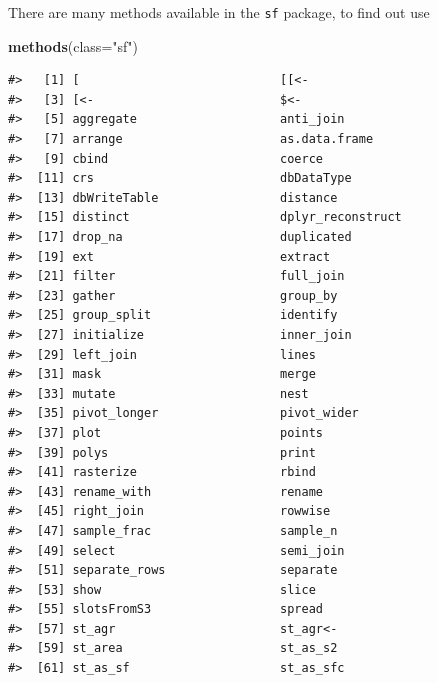 \documentclass[
]{book}
\newenvironment{Shaded}{\begin{snugshade}}{\end{snugshade}}
\newcommand{\AttributeTok}[1]{\textcolor[rgb]{0.13,0.29,0.53}{#1}}
\newcommand{\FunctionTok}[1]{\textcolor[rgb]{0.13,0.29,0.53}{\textbf{#1}}}
\newcommand{\NormalTok}[1]{#1}
\newcommand{\StringTok}[1]{\textcolor[rgb]{0.31,0.60,0.02}{#1}}
\begin{document}
There are many methods available in the \texttt{sf} package, to find out use

\begin{Shaded}
\begin{Highlighting}[]
\FunctionTok{methods}\NormalTok{(}\AttributeTok{class=}\StringTok{"sf"}\NormalTok{)}
\end{Highlighting}
\end{Shaded}

\begin{verbatim}
#>   [1] [                            [[<-                        
#>   [3] [<-                          $<-                         
#>   [5] aggregate                    anti_join                   
#>   [7] arrange                      as.data.frame               
#>   [9] cbind                        coerce                      
#>  [11] crs                          dbDataType                  
#>  [13] dbWriteTable                 distance                    
#>  [15] distinct                     dplyr_reconstruct           
#>  [17] drop_na                      duplicated                  
#>  [19] ext                          extract                     
#>  [21] filter                       full_join                   
#>  [23] gather                       group_by                    
#>  [25] group_split                  identify                    
#>  [27] initialize                   inner_join                  
#>  [29] left_join                    lines                       
#>  [31] mask                         merge                       
#>  [33] mutate                       nest                        
#>  [35] pivot_longer                 pivot_wider                 
#>  [37] plot                         points                      
#>  [39] polys                        print                       
#>  [41] rasterize                    rbind                       
#>  [43] rename_with                  rename                      
#>  [45] right_join                   rowwise                     
#>  [47] sample_frac                  sample_n                    
#>  [49] select                       semi_join                   
#>  [51] separate_rows                separate                    
#>  [53] show                         slice                       
#>  [55] slotsFromS3                  spread                      
#>  [57] st_agr                       st_agr<-                    
#>  [59] st_area                      st_as_s2                    
#>  [61] st_as_sf                     st_as_sfc                   

\end{verbatim}
\end{document}
